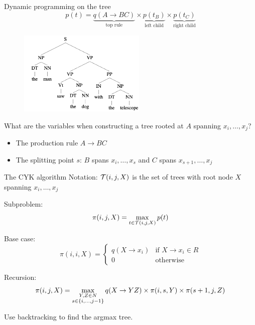 \documentclass[usenames,dvipsnames,notes,11pt,aspectratio=169]{beamer}
\begin{document}
\begin{frame}
    {Dynamic programming on the tree}
    $$
    p(t) = \underbrace{q(A\rightarrow B C)}_{\text{top rule}}
    \times \underbrace{p(t_B)}_{\text{left child}}
    \times \underbrace{p(t_C)}_{\text{right child}}
    $$
    \vspace{-1em}
    \begin{figure}
        \includegraphics[height=4cm]{figures/parse-2.png}
    \end{figure}
    \vspace{-1em}
    What are the variables when constructing a tree rooted at $A$ spanning $x_i,\ldots,x_j$?\\
    \begin{itemize}
        \item The production rule $A\rightarrow B C$
        \item The splitting point $s$: $B$ spans $x_i,\ldots,x_s$ and
            $C$ spans $x_{s+1}, \ldots, x_j$
    \end{itemize}
\end{frame}

\begin{frame}
    {The CYK algorithm}
    Notation: $\mathcal{T}(i,j,X)$ is the set of trees with root node $X$ spanning $x_i,\ldots,x_j$ 

    Subproblem:
    $$\pi(i,j,X) = \max_{t\in\mathcal{T}(i,j,X)} p(t)$$

    Base case:
    $$
    \pi(i,i,X) = \begin{cases}
        q(X\rightarrow x_i) & \text{if } X\rightarrow x_i \in R \\
        0 & \text{otherwise}
    \end{cases}
    $$

    Recursion:
    $$
    \pi(i,j,X) = \max_{\substack{Y,Z \in N\\ s\in\left\{ i,\ldots,j-1 \right\}}}
    q(X\rightarrow YZ)\times \pi(i,s,Y) \times \pi(s+1, j, Z)
    $$

    Use backtracking to find the argmax tree.
\end{frame}
\end{document}
